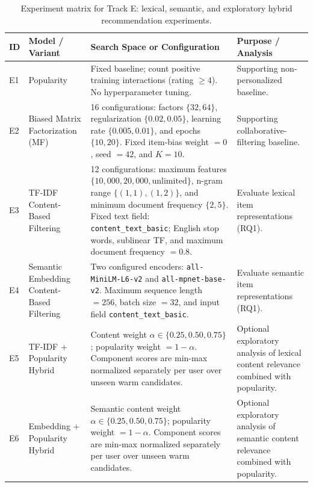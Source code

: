 

\begin{table}[t]
\centering
\caption{Experiment matrix for Track E: lexical, semantic, and exploratory hybrid recommendation experiments.}
\label{tab:exp-matrix}
\scriptsize
\setlength{\tabcolsep}{3pt}
\renewcommand{\arraystretch}{1.15}

\begin{tabular}{p{0.55cm} p{2.55cm} p{7.0cm} p{5.6cm}}
\toprule
ID & Model / Variant & Search Space or Configuration & Purpose / Analysis \\
\midrule

E1 & Popularity &
Fixed baseline; count positive training interactions (rating $\geq 4$). No hyperparameter tuning. &
Supporting non-personalized baseline. \\

E2 & Biased Matrix Factorization (MF) &
16 configurations: factors $\{32,64\}$, regularization $\{0.02,0.05\}$, learning rate $\{0.005,0.01\}$, and epochs $\{10,20\}$. Fixed item-bias weight $=0$, seed $=42$, and $K=10$. &
Supporting collaborative-filtering baseline. \\

E3 & TF-IDF Content-Based Filtering &
12 configurations: maximum features $\{10{,}000,20{,}000,\text{unlimited}\}$, n-gram range $\{(1,1),(1,2)\}$, and minimum document frequency $\{2,5\}$. Fixed text field: \texttt{content\_text\_basic}; English stop words, sublinear TF, and maximum document frequency $=0.8$. &
Evaluate lexical item representations (RQ1). \\

E4 & Semantic Embedding Content-Based Filtering &
Two configured encoders: \texttt{all-MiniLM-L6-v2} and \texttt{all-mpnet-base-v2}. Maximum sequence length $=256$, batch size $=32$, and input field \texttt{content\_text\_basic}. &
Evaluate semantic item representations (RQ1). \\

E5 & TF-IDF + Popularity Hybrid &
Content weight $\alpha \in \{0.25,0.50,0.75\}$; popularity weight $=1-\alpha$. Component scores are min-max normalized separately per user over unseen warm candidates. &
Optional exploratory analysis of lexical content relevance combined with popularity. \\

E6 & Embedding + Popularity Hybrid &
Semantic content weight $\alpha \in \{0.25,0.50,0.75\}$; popularity weight $=1-\alpha$. Component scores are min-max normalized separately per user over unseen warm candidates. &
Optional exploratory analysis of semantic content relevance combined with popularity. \\


\end{tabular}
\end{table}
